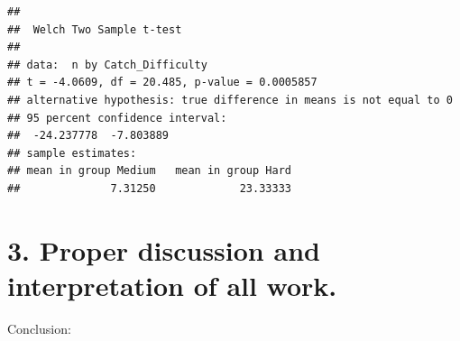 \documentclass[]{article}
\newenvironment{Shaded}{\begin{snugshade}}{\end{snugshade}}
\newcommand{\KeywordTok}[1]{\textcolor[rgb]{0.13,0.29,0.53}{\textbf{#1}}}
\newcommand{\DataTypeTok}[1]{\textcolor[rgb]{0.13,0.29,0.53}{#1}}
\newcommand{\DecValTok}[1]{\textcolor[rgb]{0.00,0.00,0.81}{#1}}
\newcommand{\StringTok}[1]{\textcolor[rgb]{0.31,0.60,0.02}{#1}}
\newcommand{\OperatorTok}[1]{\textcolor[rgb]{0.81,0.36,0.00}{\textbf{#1}}}
\newcommand{\NormalTok}[1]{#1}
\begin{document}
\begin{Shaded}
\end{Shaded}

\begin{verbatim}
## 
##  Welch Two Sample t-test
## 
## data:  n by Catch_Difficulty
## t = -4.0609, df = 20.485, p-value = 0.0005857
## alternative hypothesis: true difference in means is not equal to 0
## 95 percent confidence interval:
##  -24.237778  -7.803889
## sample estimates:
## mean in group Medium   mean in group Hard 
##              7.31250             23.33333
\end{verbatim}

\section{3. Proper discussion and interpretation of all
work.}\label{proper-discussion-and-interpretation-of-all-work.}

Conclusion:
\end{document}
